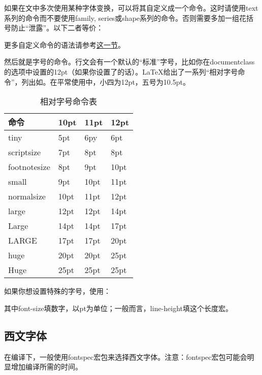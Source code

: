 {如果在文中多次使用某种字体变换，可以将其自定义成一个命令。这时请使用text系列的命令而不要使用family, series或shape系列的命令。否则需要多加一组花括号防止“泄露”。以下二者等价：
\begin{latex}{}
\newcommand{\concept}[1]{\textbf{#1}}
\newcommand{\concept}[1]{{\bfseries #1}}
\end{latex}

更多自定义命令的语法请参考\hyperref[sec:newcommand]{这一节}。

然后就是字号的命令。行文会有一个默认的“标准”字号，比如你在documentclass的选项中设置的12pt（如果你设置了的话）。\LaTeX 给出了一系列“相对字号命令”，列出如。在平常使用中，小四为12pt，五号为10.5pt。
\begin{table}[!ht]
\centering
\caption{相对字号命令表}
\label{tab:fontsize}
\begin{tabular}{|>{\ttfamily\char92}l|*{3}{l|}}
\hline
命令         & 10pt & 11pt & 12pt \\
\hline
tiny         & 5pt  & 6py  & 6pt  \\
scriptsize   & 7pt  & 8pt  & 8pt  \\
footnotesize & 8pt  & 9pt  & 10pt \\
small        & 9pt  & 10pt & 11pt \\
normalsize   & 10pt & 11pt & 12pt \\
large        & 12pt & 12pt & 14pt \\
Large        & 14pt & 14pt & 17pt \\
LARGE        & 17pt & 17pt & 20pt \\
huge         & 20pt & 20pt & 25pt \\
Huge         & 25pt & 25pt & 25pt \\
\hline
\end{tabular}
\end{table}

如果你想设置特殊的字号，使用：
\begin{latex}{}
\end{latex}

其中font-size填数字，以pt为单位；一般而言，line-height填\latexline{\\baselineskip}这个长度宏。

\subsection{西文字体}
在\xelatex 编译下，一般使用fontspec宏包来选择西文字体。注意：fontspec宏包可能会明显增加编译所需的时间。
\begin{latex}{}
\usepackage{fontspec}
\end{latex}

}

